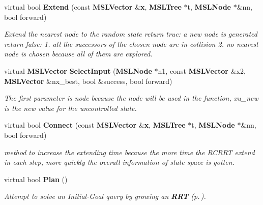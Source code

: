 \begin{CompactItemize}
virtual bool {\bf Extend} (const {\bf MSLVector} \&{\bf x}, {\bf MSLTree} $\ast$t, {\bf MSLNode} $\ast$\&nn, bool forward)
\begin{CompactList}\small\item\em Extend the nearest node to the random state return true: a new node is generated return false: 1. all the successors of the chosen node are in collision 2. no nearest node is chosen because all of them are explored.\item\end{CompactList}\item 
virtual {\bf MSLVector} {\bf Select\-Input} ({\bf MSLNode} $\ast$n1, const {\bf MSLVector} \&x2, {\bf MSLVector} \&nx\_\-best, bool \&success, bool forward)
\begin{CompactList}\small\item\em The first parameter is node because the node will be used in the function, xu\_\-new is the new value for the uncontrolled state.\item\end{CompactList}\item 
virtual bool {\bf Connect} (const {\bf MSLVector} \&{\bf x}, {\bf MSLTree} $\ast$t, {\bf MSLNode} $\ast$\&nn, bool forward)
\begin{CompactList}\small\item\em method to increase the extending time because the more time the RCRRT extend in each step, more quickly the overall information of state space is gotten.\item\end{CompactList}\item 
virtual bool {\bf Plan} ()
\begin{CompactList}\small\item\em Attempt to solve an Initial-Goal query by growing an {\bf RRT} {\rm (p.\,\pageref{classRRT})}.\item\end{CompactList}\end{CompactItemize}
